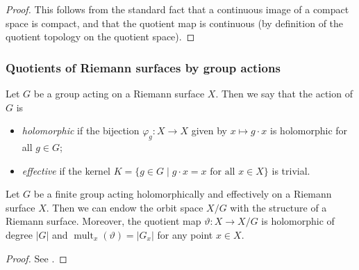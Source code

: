 \documentclass[10pt,notitlepage]{article}
\numberwithin{equation}{subsection}
\DeclareMathOperator{\mult}{mult}
\begin{document}
            \begin{proof}
                This follows from the standard fact that a continuous image of a compact space is compact, and that the quotient map is continuous (by definition of the quotient topology on the quotient space).
            \end{proof}
        



        \subsubsection{Quotients of Riemann surfaces by group actions} %
        \label{ssub:quotients_of_riemann_surfaces_by_group_actions}

            \begin{definition}
                Let $G$ be a group acting on a Riemann surface $X$.
                Then we say that the action of $G$ is
                \begin{itemize}
                    \item \emph{holomorphic} if the bijection $\varphi_g\colon X\to X$ given by $x\mapsto g\cdot x$ is holomorphic for all $g\in G$;
                    \item \emph{effective} if the kernel $K=\{g\in G \mid g\cdot x = x\text{ for all }x\in X\}$ is trivial.\qedhere
                \end{itemize}
            \end{definition}

            \begin{theorem}\label{thm:group-on-rs}
                Let $G$ be a finite group acting holomorphically and effectively on a Riemann surface $X$.
                Then we can endow the orbit space $X/G$ with the structure of a Riemann surface.
                Moreover, the quotient map $\vartheta\colon X\to X/G$ is holomorphic of degree $|G|$ and $\mult_x(\vartheta)=|G_x|$ for any point $x\in X$.
            \end{theorem}

            \begin{proof}
                See \cite[Chapter~III,~Theorem~3.4]{Miranda:1995uz}.
            \end{proof}
        
\end{document}
